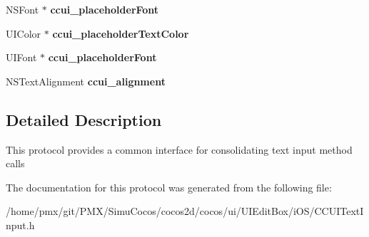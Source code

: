 \begin{DoxyCompactItemize}
N\+S\+Font $\ast$ {\bfseries ccui\+\_\+placeholder\+Font}
\item 
\mbox{\label{protocolCCUITextInput_01-p_aa0df8a141592e2cdd81b6936d7d35cfa}} 
U\+I\+Color $\ast$ {\bfseries ccui\+\_\+placeholder\+Text\+Color}
\item 
\mbox{\label{protocolCCUITextInput_01-p_aaf652fc3748222ca11ff0ab7be3e2423}} 
U\+I\+Font $\ast$ {\bfseries ccui\+\_\+placeholder\+Font}
\item 
\mbox{\label{protocolCCUITextInput_01-p_a95a6b7342870831f2ad5b7c7b02e2c6c}} 
N\+S\+Text\+Alignment {\bfseries ccui\+\_\+alignment}
\end{DoxyCompactItemize}


\subsection{Detailed Description}
This protocol provides a common interface for consolidating text input method calls 

The documentation for this protocol was generated from the following file\+:\begin{DoxyCompactItemize}
\item 
/home/pmx/git/\+P\+M\+X/\+Simu\+Cocos/cocos2d/cocos/ui/\+U\+I\+Edit\+Box/i\+O\+S/C\+C\+U\+I\+Text\+Input.\+h\end{DoxyCompactItemize}
